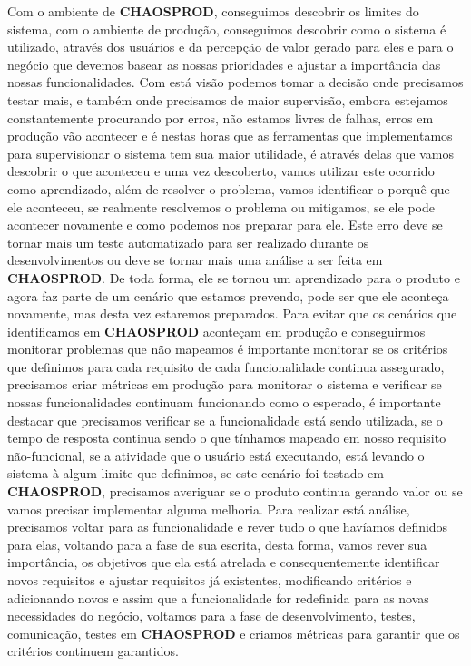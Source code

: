       Com o ambiente de \textbf{CHAOSPROD}, conseguimos descobrir os limites do
      sistema, com o ambiente de produção, conseguimos descobrir como o sistema é
      utilizado, através dos usuários e da percepção de valor gerado para eles
      e para o negócio que devemos basear as nossas prioridades e ajustar a
      importância das nossas funcionalidades. Com está visão podemos tomar a decisão
      onde precisamos testar mais, e também onde precisamos de maior supervisão,
      embora estejamos constantemente procurando por erros, não estamos livres de
      falhas, erros em produção vão acontecer e é nestas horas que as ferramentas
      que implementamos para supervisionar o sistema tem sua maior utilidade, é
      através delas que vamos descobrir o que aconteceu e uma vez descoberto, vamos
      utilizar este ocorrido como aprendizado, além de resolver o problema, vamos
      identificar o porquê que ele aconteceu, se realmente resolvemos o problema ou
      mitigamos, se ele pode acontecer novamente e como podemos nos preparar para
      ele. Este erro deve se tornar mais um teste automatizado para ser realizado
      durante os desenvolvimentos ou deve se tornar mais uma análise a ser feita em
      \textbf{CHAOSPROD}. De toda forma, ele se tornou um aprendizado para o produto
      e agora faz parte de um cenário que estamos prevendo, pode ser que ele
      aconteça novamente, mas desta vez estaremos preparados. \newline
      Para evitar que os cenários que identificamos em \textbf{CHAOSPROD} aconteçam
      em produção e conseguirmos monitorar problemas que não mapeamos é importante
      monitorar se os critérios que definimos para cada requisito de cada funcionalidade
      continua assegurado, precisamos criar métricas em produção para monitorar
      o sistema e verificar se nossas funcionalidades continuam funcionando como o
      esperado, é importante destacar que precisamos verificar se a funcionalidade
      está sendo utilizada, se o tempo de resposta continua sendo o que tínhamos
      mapeado em nosso requisito não-funcional, se a atividade que o usuário está
      executando, está levando o sistema à algum limite que definimos, se este
      cenário foi testado em \textbf{CHAOSPROD}, precisamos averiguar se o
      produto continua gerando valor ou se vamos precisar implementar alguma
      melhoria. Para realizar está análise, precisamos voltar para as funcionalidade
      e rever tudo o que havíamos definidos para elas, voltando para a fase de
      sua escrita, desta forma, vamos rever sua importância, os objetivos que ela
      está atrelada e consequentemente identificar novos requisitos e ajustar
      requisitos já existentes, modificando critérios e adicionando novos e
      assim que a funcionalidade for redefinida para as novas necessidades do
      negócio, voltamos para a fase de desenvolvimento, testes, comunicação,
      testes em \textbf{CHAOSPROD} e criamos métricas para garantir que
      os critérios continuem garantidos.

